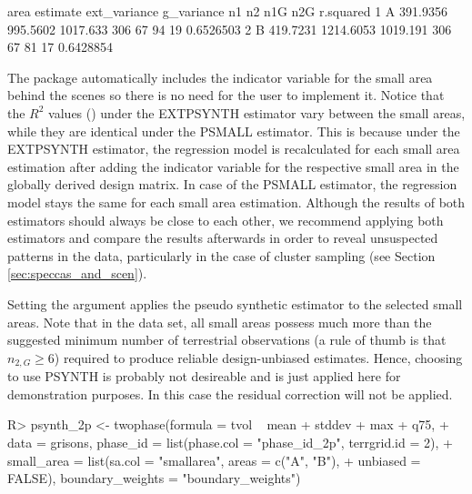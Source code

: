 \begin{small}
\begin{Schunk}
\begin{Soutput}
  area estimate ext_variance g_variance  n1 n2 n1G n2G r.squared
1    A 391.9356     995.5602   1017.633 306 67  94  19 0.6526503
2    B 419.7231    1214.6053   1019.191 306 67  81  17 0.6428854
\end{Soutput}
\end{Schunk}
\end{small}

The  package automatically includes the indicator variable for the small area behind the scenes so there is no need for the user to implement it. Notice that the $R^2$ values () under the EXTPSYNTH estimator vary between the small areas, while they are identical under the PSMALL estimator. This is because under the EXTPSYNTH estimator, the regression model is recalculated for each small area estimation after adding the indicator variable for the respective small area in the globally derived design matrix. In case of the PSMALL estimator, the regression model stays the same for each small area estimation. Although the results of both estimators should always be close to each other, we recommend applying both estimators and compare the results afterwards in order to reveal unsuspected patterns in the data, particularly in the case of cluster sampling (see Section \ref{sec:speccas_and_scen}).\par

Setting the argument  applies the pseudo synthetic estimator to the selected small areas. Note that in the  data set, all small areas possess much more than the suggested minimum number of terrestrial observations (a rule of thumb is that $n_{2,G} $) required to produce reliable design-unbiased estimates. Hence, choosing to use PSYNTH is probably not desireable and is just applied here for demonstration purposes. In this case the residual correction will not be applied.


\begin{small}
\begin{Schunk}
\begin{Sinput}
R> psynth_2p <- twophase(formula = tvol ~ mean + stddev + max + q75, 
+    data = grisons, phase_id = list(phase.col = "phase_id_2p", terrgrid.id = 2),
+    small_area = list(sa.col = "smallarea", areas = c("A", "B"),
+    unbiased = FALSE), boundary_weights = "boundary_weights")
\end{Sinput}
\end{Schunk}
\end{small}

